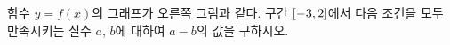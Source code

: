 \noindent\begin{minipage}[t]{0.58\linewidth}\vspace{0pt}\raggedright 함수 $y=f(x)$의 그래프가 오른쪽 그림과 같다. 구간 $[-3{,}\mkern3mu\mathopen{}2]$에서 다음 조건을 모두 만족시키는 실수 $a$, $b$에 대하여 $a-b$의 값을 구하시오.\end{minipage}\hfill\begin{minipage}[t]{0.4\linewidth}\vspace{0pt}\centering \resizebox{\ifdim\width>\linewidth\linewidth\else\width\fi}{!}{}\end{minipage}\par
\noindent {}
